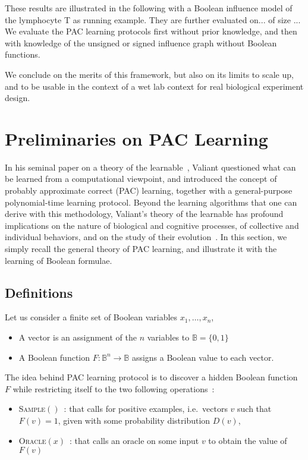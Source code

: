 \documentclass{llncs}
\begin{document}
These results are illustrated in the following with a Boolean influence model of the lymphocyte T as running example.
They are further evaluated on... of size ...
We evaluate the PAC learning protocols first without prior knowledge, and then with knowledge of the unsigned or signed influence graph without Boolean functions.

We conclude on the merits of this framework, but also on its limits to scale up,
and to be usable in the context of a wet lab context for real biological experiment design.


\section{Preliminaries on PAC Learning}\label{pac}

In his seminal paper on a theory of the learnable~\cite{Valiant84cacm},
Valiant questioned what can be learned from a computational viewpoint,
and introduced the concept of probably approximate correct (PAC) learning,
together with a general-purpose polynomial-time learning protocol.
Beyond the learning algorithms that one can derive with this methodology,
Valiant's theory of the learnable has profound implications
on the nature of biological and cognitive processes,
of collective and individual behaviors,
and on the study of their evolution~\cite{Valiant13book}.
In this section, we simply recall the general theory of PAC learning,
and illustrate it with the learning of Boolean formulae.

\subsection{Definitions}

Let us consider a finite set of Boolean variables $x_1,\ldots,x_n$,
\begin{itemize}
	\item A vector is an assignment of the $n$ variables to $\mathbb{B} = \{0,1\}$
	\item A Boolean function $F:{\mathbb{B}}^n \rightarrow \mathbb{B}$
	assigns a Boolean value to each vector.
\end{itemize}

The idea behind PAC learning protocol is to discover a hidden Boolean function $F$ while restricting itself to the two following operations~:
\begin{itemize}
  \item
\textsc{Sample}$()$~: that calls for positive examples, i.e.~vectors $v$ such that $F(v)=1$, given with some probability distribution $D(v)$,
  \item
\textsc{Oracle}$(x)$~: that calls an oracle on some input $v$ to obtain the value of $F(v)$
\end{itemize}
\end{document}

